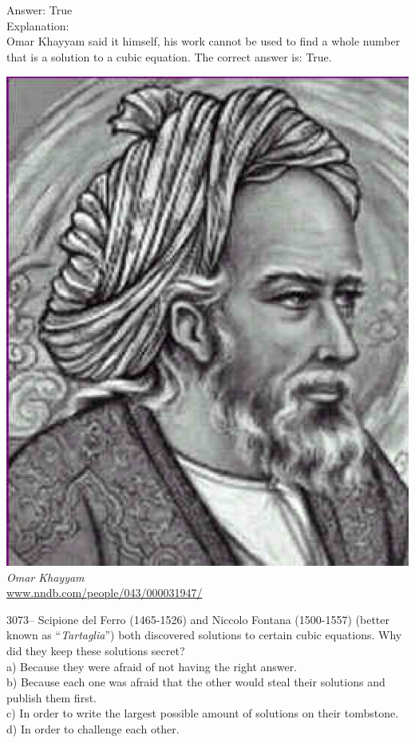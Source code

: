\documentclass[letterpaper, 12pt]{article}
\begin{document}
Answer: True\\

Explanation:\\
Omar Khayyam said it himself, his work cannot be used to find a whole number that is a solution to a cubic equation. The correct answer is: True.
\begin{center}
\includegraphics[scale=0.3]{Omar_Khayyam.eps}\\
\emph{{\small Omar Khayyam}}\\
\href{http://www.nndb.com/people/043/000031947/}{www.nndb.com/people/043/000031947/}\\[5mm]
\end{center}



3073-- Scipione del Ferro (1465-1526) and Niccolo Fontana (1500-1557) (better known as ``\emph{Tartaglia}'') both discovered solutions to certain cubic equations. Why did they keep these solutions secret?\\

a) Because they were afraid of not having the right answer.\\
b) Because each one was afraid that the other would steal their solutions and publish them first.\\
c) In order to write the largest possible amount of solutions on their tombstone.\\
d) In order to challenge each other.\\
\end{document}

